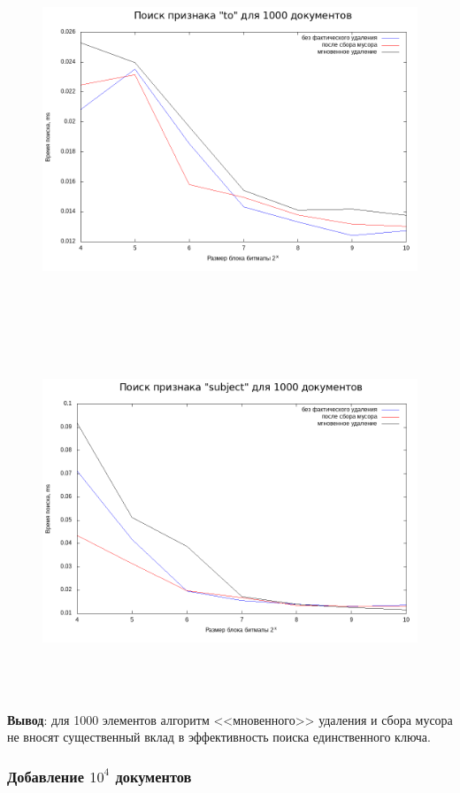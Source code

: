 \begin{figure}[H]
\includegraphics[width=\linewidth, height=11cm]{fig/limit_1/1e3/to_time.png}
\includegraphics[width=\linewidth, height=11cm]{fig/limit_1/1e3/subject_time.png}
\end{figure}

\textbf{Вывод}: для 1000 элементов алгоритм <<мновенного>> удаления и сбора мусора
не вносят существенный вклад в эффективность поиска единственного ключа.

\subsubsection{Добавление $10^4$ документов}

